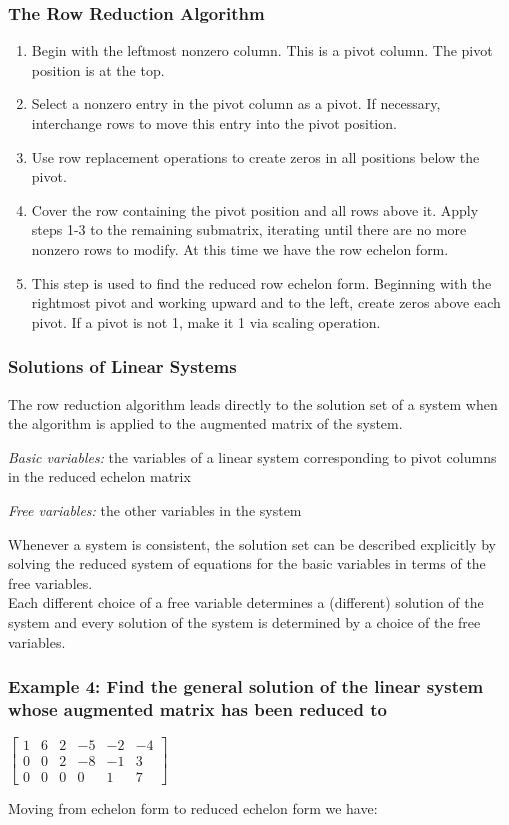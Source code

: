 \documentclass[12pt]{article} %
\begin{document}
\subsubsection{The Row Reduction Algorithm}
\begin{enumerate}
	\item Begin with the leftmost nonzero column. This is a pivot column. The pivot position is at the top.
	\item Select a nonzero entry in the pivot column as a pivot. If necessary, interchange rows to move this entry into the pivot position. 
	\item Use row replacement operations to create zeros in all positions below the pivot.
	\item Cover the row containing the pivot position and all rows above it. Apply steps 1-3 to the remaining submatrix, iterating until there are no more nonzero rows to modify. At this time we have the row echelon form.
	\item This step is used to find the reduced row echelon form. Beginning with the rightmost pivot and working upward and to the left, create zeros above each pivot. If a pivot is not 1, make it 1 via scaling operation.
\end{enumerate}

\subsubsection{Solutions of Linear Systems}
The row reduction algorithm leads directly to the solution set of a system when the algorithm is applied to the augmented matrix of the system.

\emph{Basic variables:} the variables of a linear system corresponding to pivot columns in the reduced echelon matrix 

\emph{Free variables:} the other variables in the system

Whenever a system is consistent, the solution set can be described explicitly by solving the reduced system of equations for the basic variables in terms of the free variables.\\
Each different choice of a free variable determines a (different) solution of the system and every solution of the system is determined by a choice of the free variables.

\subsubsection{Example 4: Find the general solution of the linear system whose augmented matrix has been reduced to}
\begin{center}
	$\begin{bmatrix}
		1 & 6 & 2 & -5 & -2 & -4\\
		0 & 0 & 2 & -8 & -1 & 3\\
		0 & 0 & 0 & 0 & 1 & 7
	\end{bmatrix}$
\end{center}
Moving from echelon form to reduced echelon form we have:\\
\end{document}

